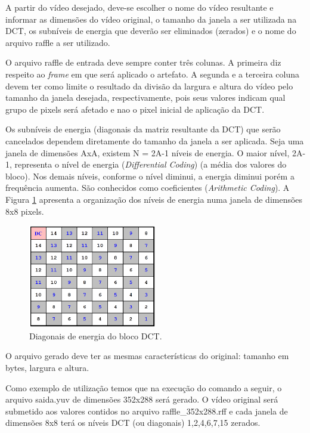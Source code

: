 A partir do vídeo desejado, deve-se escolher o nome do vídeo resultante e informar as dimensões do vídeo original, o tamanho da janela a ser utilizada na DCT, os subníveis de energia que deverão ser eliminados (zerados) e o nome do arquivo raffle a ser utilizado.

O arquivo raffle de entrada deve sempre conter três colunas. A primeira diz respeito ao \emph{frame} em que será aplicado o artefato. A segunda e a terceira coluna devem ter como limite o resultado da divisão da largura e altura do vídeo pelo tamanho da janela desejada, respectivamente, pois seus valores indicam qual grupo de pixels será afetado e nao o pixel inicial de aplicação da DCT.

Os subníveis de energia (diagonais da matriz resultante da DCT) que serão cancelados dependem diretamente do tamanho da janela a ser aplicada. Seja uma janela de dimensões AxA, existem N = 2A-1 níveis de energia. O maior nível, 2A-1, representa o nível de energia  (\emph{Differential Coding}) (a média dos valores do bloco). Nos demais níveis, conforme o nível diminui, a energia diminui porém a frequência aumenta. São conhecidos como coeficientes  (\emph{Arithmetic Coding}). A Figura \ref{fig:niveisdct} apresenta a organização dos níveis de energia numa janela de dimensões 8x8 pixels.

\begin{figure}[!htb]
	\centering
	\includegraphics[width=0.5\textwidth]{./imgs/niveisdct.png}
	\caption{Diagonais de energia do bloco DCT.}
	\label{fig:niveisdct}
	\fonte{\cite{}}
\end{figure}

O arquivo gerado deve ter as mesmas características do original: tamanho em bytes, largura e altura.

Como exemplo de utilização temos que na execução do comando a seguir, o arquivo saida.yuv de dimensões 352x288 será gerado. O vídeo original será submetido aos valores contidos no arquivo raffle\_352x288.rff e cada janela de dimensões 8x8 terá os níveis DCT (ou diagonais) 1,2,4,6,7,15 zerados.

